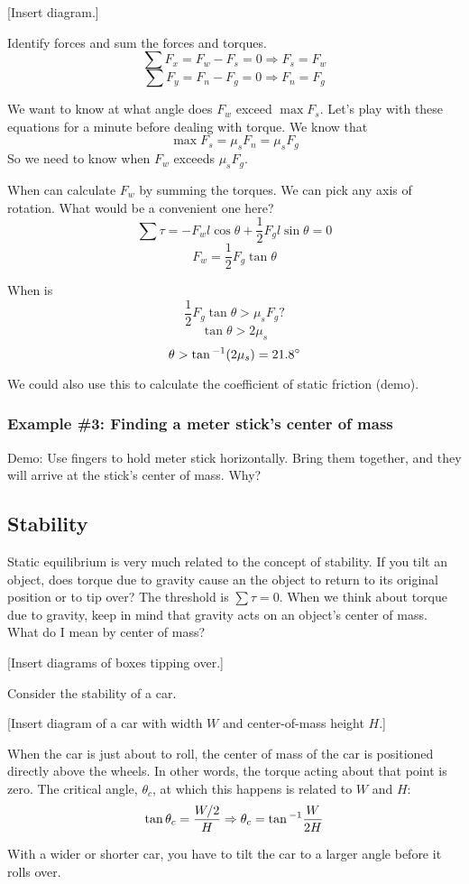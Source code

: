 [Insert diagram.]
\vspace{5cm}

Identify forces and sum the forces and torques.
$$\sum F_x = F_w-F_s=0 \Rightarrow F_s=F_w$$
$$\sum F_y = F_n - F_g=0 \Rightarrow F_n=F_g$$

We want to know at what angle does $F_w$ exceed $\max F_s$. Let's play with these equations for a minute before dealing with torque. We know that
$$\max F_s=\mu_sF_n=\mu_sF_g$$
So we need to know when $F_w$ exceeds $\mu_sF_g$.

When can calculate $F_w$ by summing the torques. We can pick any axis of rotation. What would be a convenient one here?
$$\sum \tau=-F_wl\cos\theta+\frac{1}{2}F_gl\sin\theta=0$$
$$F_w=\frac{1}{2}F_g\tan\theta$$

When is
$$\frac{1}{2}F_g\tan\theta > \mu_s F_g?$$
$$\tan\theta > 2\mu_s$$
$$\theta > \tan\displaystyle^{-1}(2\mu_s)=21.8^\circ$$

We could also use this to calculate the coefficient of static friction (demo).


\subsubsection{Example \#3: Finding a meter stick's center of mass}
Demo: Use fingers to hold meter stick horizontally. Bring them together, and they will arrive at the stick's center of mass. Why?
\vspace{5cm}

\subsection{Stability}
Static equilibrium is very much related to the concept of stability. If you tilt an object, does torque due to gravity cause an the object to return to its original position or to tip over? The threshold is $\sum \tau =0$. When we think about torque due to gravity, keep in mind that gravity acts on an object's center of mass. What do I mean by center of mass?

[Insert diagrams of boxes tipping over.]
\vspace{5cm}

Consider the stability of a car.

[Insert diagram of a car with width $W$ and center-of-mass height $H$.]
\vspace{5cm}

When the car is just about to roll, the center of mass of the car is positioned directly above the wheels. In other words, the torque acting about that point is zero. The critical angle, $\theta_c$, at which this happens is related to $W$ and $H$:
$$\tan\theta_c=\frac{W/2}{H}\Rightarrow \theta_c=\tan\displaystyle^{-1}\frac{W}{2H}$$

With a wider or shorter car, you have to tilt the car to a larger angle before it rolls over.

\clearpage
